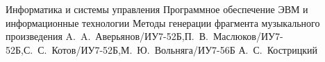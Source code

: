 \documentclass{bmstu}
\begin{document}
\makeresearchtitle
	{Информатика и системы управления} %
	{Программное обеспечение ЭВМ и информационные технологии} %
	{Методы генерации фрагмента музыкального произведения} %
	{A.~A.~Аверьянов/ИУ7-52Б,П.~В.~Маслюков/ИУ7-52Б,С.~С.~Котов/ИУ7-52Б,М.~Ю.~Вольняга/ИУ7-56Б} %
	{А.~С.~Кострицкий} %
	{} %

\maketableofcontents






\makebibliography
\end{document}
